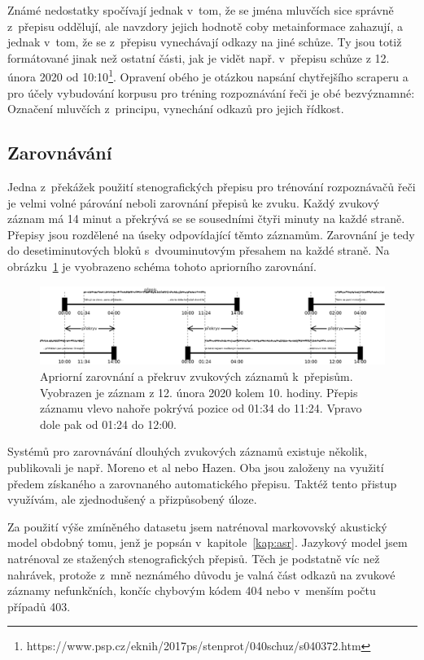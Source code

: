 Známé nedostatky spočívají jednak v~tom, že se jména mluvčích sice správně z~přepisu
oddělují, ale navzdory jejich hodnotě coby metainformace zahazují, a jednak
v~tom, že se z~přepisu vynechávají odkazy na jiné schůze. Ty jsou totiž
formátované jinak než ostatní části, jak je vidět např. v~přepisu schůze z 12.
února 2020 od
10:10\footnote{https://www.psp.cz/eknih/2017ps/stenprot/040schuz/s040372.htm}.
Opravení obého je otázkou napsání chytřejšího scraperu a pro účely vybudování
korpusu pro tréning rozpoznávání řeči je obé bezvýznamné: Označení mluvčích
z~principu, vynechání odkazů pro jejich řídkost.

\subsection{Zarovnávání}
\label{subsec:svolocz:zarovnavani}

Jedna z~překážek použití stenografických přepisu pro trénování rozpoznávačů řeči
je velmi volné párování neboli zarovnání přepisů ke zvuku. Každý zvukový záznam
má 14 minut a překrývá se se sousedními čtyři minuty na každé straně.
Přepisy jsou rozdělené na úseky odpovídající těmto záznamům. Zarovnání je tedy
do desetiminutových bloků s~dvouminutovým přesahem na každé straně. Na
obrázku~\ref{fig:svolocz:overlap} je vyobrazeno schéma tohoto apriorního
zarovnání.

\begin{figure}[htpb]
\includegraphics[scale=0.25]{rc/svolocz-overlap.eps}
\caption{Apriorní zarovnání a překruv zvukových záznamů k~přepisům. Vyobrazen je
záznam z 12. února 2020 kolem 10. hodiny. Přepis záznamu vlevo nahoře pokrývá
pozice od 01:34 do 11:24. Vpravo dole pak od 01:24 do 12:00.}
\label{fig:svolocz:overlap}
\end{figure}

Systémů pro zarovnávání dlouhých zvukových záznamů existuje několik, publikovali
je např. Moreno et al\cite{moreno1998recursive} nebo
Hazen\cite{hazen2006automatic}. Oba jsou založeny na využití předem získaného a
zarovnaného automatického přepisu. Taktéž tento přistup využívám, ale
zjednodušený a přizpůsobený úloze.

Za použití výše zmíněného datasetu\cite{pspdata} jsem natrénoval markovovský
akustický model obdobný tomu, jenž je popsán v~kapitole~\ref{kap:asr}. Jazykový
model jsem natrénoval ze stažených stenografických přepisů. Těch je podstatně
víc než nahrávek, protože z~mně neznámého důvodu je valná část odkazů na zvukové
záznamy nefunkčních, končíc chybovým kódem 404 nebo v~menším počtu případů 403.

